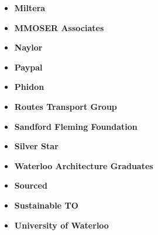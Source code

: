 \documentclass[main.tex]{subfiles}
\begin{document}
\begin{multicols}{3}
\begin{itemize}[label={},noitemsep]
    \item \textbf{Miltera}
    \end{itemize}
    \columnbreak
    \begin{itemize}[label={},noitemsep]
    \item \textbf{MMOSER Associates}
    \end{itemize}
    \columnbreak
    \begin{itemize}[label={},noitemsep]
    \item \textbf{Naylor}
    \end{itemize}
    \columnbreak
\end{multicols}

\begin{multicols}{3}
\begin{itemize}[label={},noitemsep]
    \item \textbf{Paypal}
    \end{itemize}
    \columnbreak
    \begin{itemize}[label={},noitemsep]
    \item \textbf{Phidon}
    \end{itemize}
    \columnbreak
    \begin{itemize}[label={},noitemsep]
    \item \textbf{Routes Transport Group}
    \end{itemize}
    \columnbreak
\end{multicols}

\begin{multicols}{3}
\begin{itemize}[label={},noitemsep]
    \item \textbf{Sandford Fleming Foundation}
    \end{itemize}
    \columnbreak
    \begin{itemize}[label={},noitemsep]
    \item \textbf{Silver Star}
    \end{itemize}
    \columnbreak
    \begin{itemize}[label={},noitemsep]
    \item \textbf{Waterloo Architecture Graduates}
    \end{itemize}
    \columnbreak
\end{multicols}

\begin{multicols}{3}
\begin{itemize}[label={},noitemsep]
    \item \textbf{Sourced}
    \end{itemize}
    \columnbreak
    \begin{itemize}[label={},noitemsep]
    \item \textbf{Sustainable TO}
    \end{itemize}
    \columnbreak
    \begin{itemize}[label={},noitemsep]
    \item \textbf{University of Waterloo}
    \end{itemize}
    \columnbreak
\end{multicols}
\end{document}
